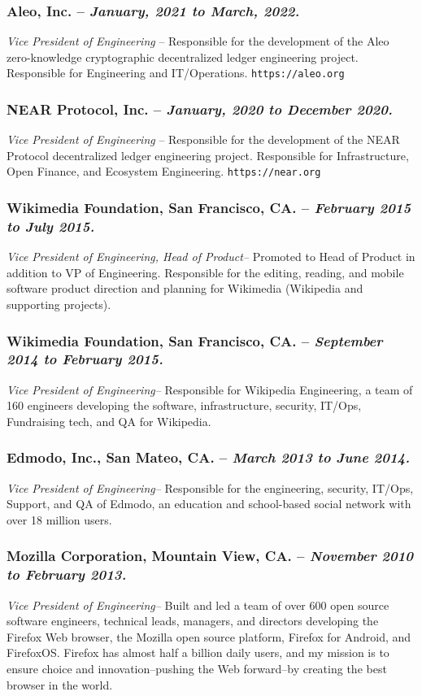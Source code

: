 \documentclass[10pt]{report}
\begin{document}
\subsubsection*{Aleo, Inc. -- \emph{January, 2021 to March, 2022. }} \emph{Vice
President of Engineering} -- Responsible for the development of the Aleo
zero-knowledge cryptographic decentralized ledger engineering project.
Responsible for Engineering and IT/Operations.  \texttt{https://aleo.org}

\subsubsection*{NEAR Protocol, Inc. -- \emph{January, 2020 to December 2020. }}
\emph{Vice President of Engineering} -- Responsible for the development of the
NEAR Protocol decentralized ledger engineering project. Responsible for
Infrastructure, Open Finance, and Ecosystem Engineering.
\texttt{https://near.org}

\subsubsection*{Wikimedia Foundation, San Francisco, CA. -- \emph{February 2015
to July 2015. }} \emph{Vice President of Engineering, Head of Product--}
Promoted to Head of Product in addition to VP of Engineering.  Responsible for
the editing, reading, and mobile software product direction and planning for
Wikimedia (Wikipedia and supporting projects).

\subsubsection*{Wikimedia Foundation, San Francisco, CA. -- \emph{September
2014 to February 2015. }} \emph{Vice President of Engineering--} Responsible
for Wikipedia Engineering, a team of 160 engineers developing the software,
infrastructure, security, IT/Ops, Fundraising tech, and QA for Wikipedia.

\subsubsection*{Edmodo, Inc., San Mateo, CA. -- \emph{March 2013 to June 2014.
}} \emph{Vice President of Engineering--} Responsible for the engineering,
security, IT/Ops, Support, and QA of Edmodo, an education and school-based
social network with over 18 million users.

\subsubsection*{Mozilla Corporation, Mountain View, CA. -- \emph{November 2010
to February 2013. }} \emph{Vice President of Engineering--} Built and led a
team of over 600 open source software engineers, technical leads, managers, and
directors developing the Firefox Web browser, the Mozilla open source platform,
Firefox for Android, and FirefoxOS.  Firefox has almost half a billion daily
users, and my mission is to ensure choice and innovation--pushing the Web
forward--by creating the best browser in the world.
\end{document}
